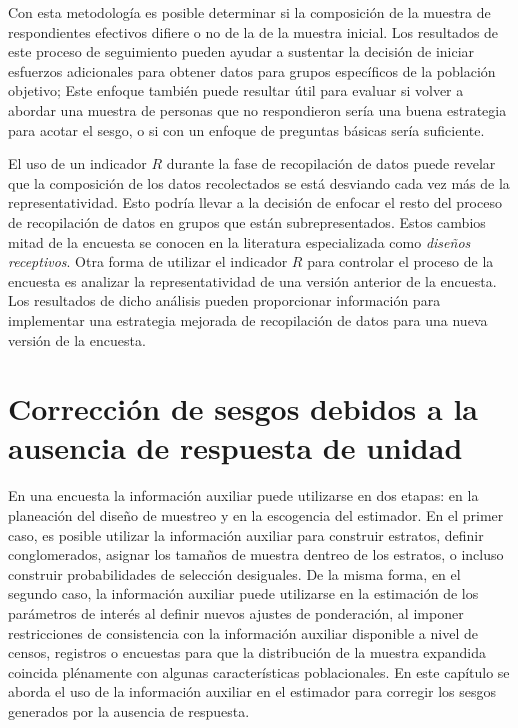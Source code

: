 \documentclass[
  10pt,
  spanish,
]{book}
\begin{document}
Con esta metodología es posible determinar si la composición de la muestra de respondientes efectivos difiere o no de la de la muestra inicial. Los resultados de este proceso de seguimiento pueden ayudar a sustentar
la decisión de iniciar esfuerzos adicionales para obtener datos para grupos específicos de la población objetivo; Este enfoque también puede resultar útil para evaluar si volver a abordar una muestra de personas que no respondieron sería una buena estrategia para acotar el sesgo, o si con un enfoque de preguntas básicas sería suficiente.

El uso de un indicador \(R\) durante la fase de recopilación
de datos puede revelar que la composición de los datos recolectados se está desviando cada vez más de la representatividad. Esto podría llevar a la decisión de enfocar el resto del proceso de recopilación
de datos en grupos que están subrepresentados. Estos cambios mitad de la encuesta se conocen en la literatura especializada como \emph{diseños receptivos}. Otra forma de utilizar el indicador \(R\) para controlar el proceso de la encuesta es analizar la representatividad de una versión anterior de la encuesta. Los resultados de dicho análisis pueden proporcionar información para implementar una estrategia mejorada de recopilación de datos para una nueva versión de la encuesta.

\hypertarget{correcciuxf3n-de-sesgos-debidos-a-la-ausencia-de-respuesta-de-unidad}{%
\chapter{Corrección de sesgos debidos a la ausencia de respuesta de unidad}\label{correcciuxf3n-de-sesgos-debidos-a-la-ausencia-de-respuesta-de-unidad}}

En una encuesta la información auxiliar puede utilizarse en dos etapas: en la planeación del diseño de muestreo y en la escogencia del estimador. En el primer caso, es posible utilizar la información auxiliar para construir estratos, definir conglomerados, asignar los tamaños de muestra dentreo de los estratos, o incluso construir probabilidades de selección desiguales. De la misma forma, en el segundo caso, la información auxiliar puede utilizarse en la estimación de los parámetros de interés al definir nuevos ajustes de ponderación, al imponer restricciones de consistencia con la información auxiliar disponible a nivel de censos, registros o encuestas para que la distribución de la muestra expandida coincida plénamente con algunas características poblacionales. En este capítulo se aborda el uso de la información auxiliar en el estimador para corregir los sesgos generados por la ausencia de respuesta.
\end{document}
